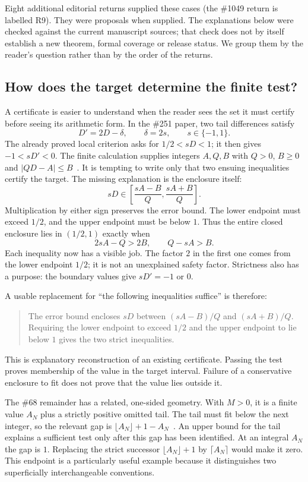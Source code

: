 Eight additional editorial returns supplied these cases (the \#1049 return
is labelled R9). They were proposals when supplied. The explanations below
were checked against the current manuscript sources; that check does not by
itself establish a new theorem, formal coverage or release status. We group them by the reader's
question rather than by the order of the returns.

\subsection{How does the target determine the finite test?}\label{sec:certificate}

A certificate is easier to understand when the reader sees the set it must
certify before seeing its arithmetic form. In the \#251 paper, two tail
differences satisfy
\[
 D'=2D-\delta,\qquad \delta=2s,\qquad s\in\{-1,1\}.
\]
The already proved local criterion asks for $1/2<sD<1$; it then gives
$-1<sD'<0$. The finite calculation supplies integers $A,Q,B$ with $Q>0$,
$B\ge0$ and $|QD-A|\le B$~\cite[section on finite separation]{paper251}.
It is tempting to write only that two ensuing inequalities certify the target.
The missing explanation is the enclosure itself:
\[
 sD\in\left[\frac{sA-B}{Q},\frac{sA+B}{Q}\right].
\]
Multiplication by either sign preserves the error bound. The lower endpoint
must exceed $1/2$, and the upper endpoint must be below $1$. Thus the entire
closed enclosure lies in $(1/2,1)$ exactly when
\[
             2sA-Q>2B,\qquad Q-sA>B.
\]
Each inequality now has a visible job. The factor $2$ in the first one comes
from the lower endpoint $1/2$; it is not an unexplained safety factor. Strictness
also has a purpose: the boundary values give $sD'=-1$ or $0$.

A usable replacement for ``the following inequalities suffice'' is therefore:
\begin{quote}
The error bound encloses $sD$ between $(sA-B)/Q$ and $(sA+B)/Q$.
Requiring the lower endpoint to exceed $1/2$ and the upper endpoint to lie
below $1$ gives the two strict inequalities.
\end{quote}
This is explanatory reconstruction of an existing certificate. Passing the
test proves membership of the value in the target interval. Failure of a
conservative enclosure to fit does not prove that the value lies outside it.

The \#68 remainder has a related, one-sided geometry. With $M>0$, it is a
finite value $A_N$ plus a strictly positive omitted tail. The tail must fit
below the next integer, so the relevant gap is
$\lfloor A_N\rfloor+1-A_N$~\cite[section on nonintegrality]{paper68}.
An upper bound for the tail explains a sufficient test only after this gap
has been identified. At an integral $A_N$ the gap is $1$. Replacing the
strict successor $\lfloor A_N\rfloor+1$ by $\lceil A_N\rceil$ would make
it zero. This endpoint is a particularly useful example because it distinguishes
two superficially interchangeable conventions.

